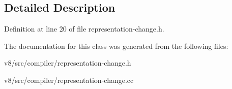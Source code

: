 \subsection{Detailed Description}


Definition at line 20 of file representation-\/change.\+h.



The documentation for this class was generated from the following files\+:\begin{DoxyCompactItemize}
\item 
v8/src/compiler/representation-\/change.\+h\item 
v8/src/compiler/representation-\/change.\+cc\end{DoxyCompactItemize}
